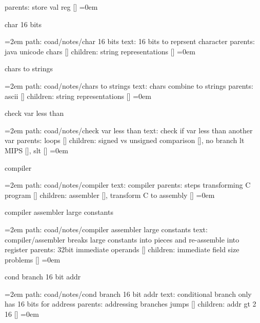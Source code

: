 \smallskip
parents:  store val reg []
\smallskip
\leftskip=0em
\par\endgroup
\bigskip
{}
char 16 bits
\smallskip
\par\begingroup
\leftskip=2em
path: coad/notes/char 16 bits
\smallskip
text:  16 bits to reprsent character
\smallskip
parents:  java unicode chars []
\smallskip
children: string representations []
\smallskip
\leftskip=0em
\par\endgroup
\bigskip
{}
chars to strings
\smallskip
\par\begingroup
\leftskip=2em
path: coad/notes/chars to strings
\smallskip
text:  chars combine to strings
\smallskip
parents:  ascii []
\smallskip
children: string representations []
\smallskip
\leftskip=0em
\par\endgroup
\bigskip
{}
check var less than
\smallskip
\par\begingroup
\leftskip=2em
path: coad/notes/check var less than
\smallskip
text:  check if var less than another var
\smallskip
parents:  loops []
\smallskip
children: signed vs unsigned comparison [], no branch lt MIPS [], slt []
\smallskip
\leftskip=0em
\par\endgroup
\bigskip
{}
compiler
\smallskip
\par\begingroup
\leftskip=2em
path: coad/notes/compiler
\smallskip
text:  compiler
\smallskip
parents:  steps transforming C program []
\smallskip
children: assembler [], transform C to assembly []
\smallskip
\leftskip=0em
\par\endgroup
\bigskip
{}
compiler assembler large constants
\smallskip
\par\begingroup
\leftskip=2em
path: coad/notes/compiler assembler large constants
\smallskip
text:  compiler/assembler breaks large constants into pieces and re-assemble into register
\smallskip
parents:  32bit immediate operands []
\smallskip
children: immediate field size problems []
\smallskip
\leftskip=0em
\par\endgroup
\bigskip
{}
cond branch 16 bit addr
\smallskip
\par\begingroup
\leftskip=2em
path: coad/notes/cond branch 16 bit addr
\smallskip
text:  conditional branch only has 16 bits for address
\smallskip
parents:  addressing branches jumps []
\smallskip
children: addr gt 2 16 []
\smallskip
\leftskip=0em
\par\endgroup

